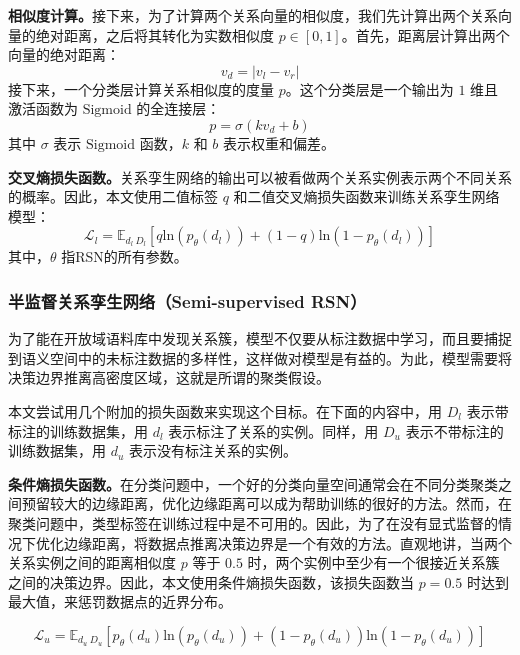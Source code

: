 \begin{translation}
\textbf{相似度计算。}接下来，为了计算两个关系向量的相似度，我们先计算出两个关系向量的绝对距离，之后将其转化为实数相似度 $p \in [0,1]$。首先，距离层计算出两个向量的绝对距离：
\begin{equation}
	v_d = |v_l - v_r|
\end{equation}
接下来，一个分类层计算关系相似度的度量 $p$。这个分类层是一个输出为 $1$ 维且激活函数为 $\text{Sigmoid}$ 的全连接层：
\begin{equation}
	 p = \sigma(kv_d + b)
\end{equation}
其中 $\sigma$ 表示 $\text{Sigmoid}$ 函数，$k$ 和 $b$ 表示权重和偏差。

\textbf{交叉熵损失函数。}关系孪生网络的输出可以被看做两个关系实例表示两个不同关系的概率。因此，本文使用二值标签 $q$ 和二值交叉熵损失函数来训练关系孪生网络模型：
\begin{equation}
	\mathcal{L}_l = \mathbb{E}_{d_l~D_l}[q\text{ln}(p_\theta(d_l)) + (1-q)\text{ln}(1 - p_\theta(d_l))]
\end{equation}
其中，$\theta$ 指RSN的所有参数。

\subsubsection{半监督关系孪生网络（Semi-supervised RSN）}
为了能在开放域语料库中发现关系簇，模型不仅要从标注数据中学习，而且要捕捉到语义空间中的未标注数据的多样性，这样做对模型是有益的。为此，模型需要将决策边界推离高密度区域，这就是所谓的聚类假设。

本文尝试用几个附加的损失函数来实现这个目标。在下面的内容中，用 $D_l$ 表示带标注的训练数据集，用 $d_l$ 表示标注了关系的实例。同样，用 $D_u$ 表示不带标注的训练数据集，用 $d_u$ 表示没有标注关系的实例。

\textbf{条件熵损失函数。}在分类问题中，一个好的分类向量空间通常会在不同分类聚类之间预留较大的边缘距离，优化边缘距离可以成为帮助训练的很好的方法。然而，在聚类问题中，类型标签在训练过程中是不可用的。因此，为了在没有显式监督的情况下优化边缘距离，将数据点推离决策边界是一个有效的方法。直观地讲，当两个关系实例之间的距离相似度 $p$ 等于 $0.5$ 时，两个实例中至少有一个很接近关系簇之间的决策边界。因此，本文使用条件熵损失函数，该损失函数当 $p=0.5$ 时达到最大值，来惩罚数据点的近界分布。

\begin{equation}
	\mathcal{L}_u = \mathbb{E}_{d_u~D_u}[p_\theta(d_u)\text{ln}(p_\theta(d_u)) + (1-p_\theta(d_u))\text{ln}(1 - p_\theta(d_u))]
\end{equation}


\end{translation}
